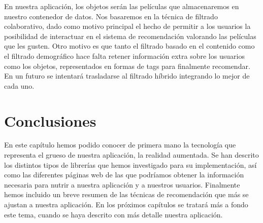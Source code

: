 En nuestra aplicación, los objetos serán las películas que almacenaremos en nuestro contenedor de datos. Nos basaremos en 
la técnica de filtrado colaborativo, dado como motivo principal el hecho de permitir a los usuarios la posibilidad de 
interactuar en el sistema de recomendación valorando las películas que les gusten. Otro motivo es que tanto el filtrado basado
en el contenido como el filtrado demográfico hace falta retener información extra sobre los usuarios como los objetos, representados 
en formas de tags para finalmente recomendar. En un futuro se intentará trasladarse al filtrado híbrido integrando lo mejor de 
cada uno.

\section{Conclusiones}
\label{makereference2.4}
En este capítulo hemos podido conocer de primera mano la tecnología que representa el grueso de nuestra aplicación, la realidad aumentada. Se han descrito 
los distintos tipos de librerías que hemos investigado para su implementación, así como las diferentes páginas web de las que podríamos obtener la información necesaria
para nutrir a nuestra aplicación y a nuestros usuarios. Finalmente hemos incluido un breve resumen de las técnicas de recomendación que más se ajustan a nuestra aplicación. En los próximos capítulos
se tratará más a fondo este tema, cuando se haya descrito con más detalle nuestra aplicación.

